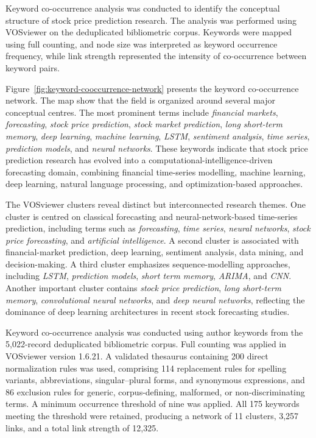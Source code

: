 \documentclass[pdflatex,sn-mathphys-num]{sn-jnl}%
\theoremstyle{thmstyleone}%
\theoremstyle{thmstyletwo}%
\theoremstyle{thmstylethree}%
\begin{document}
Keyword co-occurrence analysis was conducted to identify the conceptual structure of stock price prediction research. The analysis was performed using VOSviewer on the deduplicated bibliometric corpus. Keywords were mapped using full counting, and node size was interpreted as keyword occurrence frequency, while link strength represented the intensity of co-occurrence between keyword pairs.

Figure~\ref{fig:keyword-cooccurrence-network} presents the keyword co-occurrence network. The map show that the field is organized around several major conceptual centres. The most prominent terms include \textit{financial markets}, \textit{forecasting}, \textit{stock price prediction}, \textit{stock market prediction}, \textit{long short-term memory}, \textit{deep learning}, \textit{machine learning}, \textit{LSTM}, \textit{sentiment analysis}, \textit{time series}, \textit{prediction models}, and \textit{neural networks}. These keywords indicate that stock price prediction research has evolved into a computational-intelligence-driven forecasting domain, combining financial time-series modelling, machine learning, deep learning, natural language processing, and optimization-based approaches.



The VOSviewer clusters reveal distinct but interconnected research themes. One cluster is centred on classical forecasting and neural-network-based time-series prediction, including terms such as \textit{forecasting}, \textit{time series}, \textit{neural networks}, \textit{stock price forecasting}, and \textit{artificial intelligence}. A second cluster is associated with financial-market prediction, deep learning, sentiment analysis, data mining, and decision-making. A third cluster emphasizes sequence-modelling approaches, including \textit{LSTM}, \textit{prediction models}, \textit{short term memory}, \textit{ARIMA}, and \textit{CNN}. Another important cluster contains \textit{stock price prediction}, \textit{long short-term memory}, \textit{convolutional neural networks}, and \textit{deep neural networks}, reflecting the dominance of deep learning architectures in recent stock forecasting studies.

Keyword co-occurrence analysis was conducted using author keywords
from the 5,022-record deduplicated bibliometric corpus. Full counting
was applied in VOSviewer version 1.6.21. A validated thesaurus
containing 200 direct normalization rules was used, comprising
114 replacement rules for spelling variants, abbreviations,
singular--plural forms, and synonymous expressions, and 86 exclusion
rules for generic, corpus-defining, malformed, or non-discriminating
terms. A minimum occurrence threshold of nine was applied. All
175 keywords meeting the threshold were retained, producing a network
of 11 clusters, 3,257 links, and a total link strength of 12,325.
\end{document}
